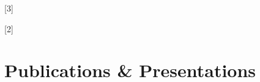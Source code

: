 \documentclass{resume} %
\begin{document}
[3]

[2]


\section{Publications \& Presentations}


\footer

\end{document}
